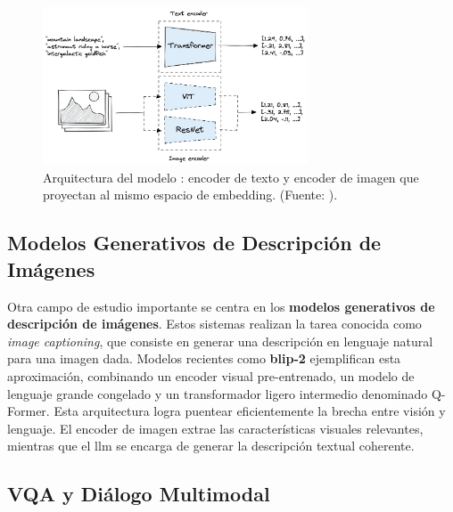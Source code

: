 \begin{figure}[h]
  \centering
  \includegraphics[width=0.7\textwidth]{archivos/clip_architecture.png}
  \caption[Arquitectura de CLIP]{Arquitectura del modelo : encoder de texto y encoder de imagen que proyectan al mismo espacio de embedding. (Fuente: \citep{noauthor_multi-modal_nodate}).}
  \label{fig:clip_architecture}
\end{figure}

\subsection{Modelos Generativos de Descripción de Imágenes}

Otra campo de estudio importante se centra en los \textbf{modelos generativos de descripción de imágenes}. Estos sistemas realizan la tarea conocida como \emph{image captioning}, que consiste en generar una descripción en lenguaje natural para una imagen dada. Modelos recientes como \textbf{\gls{blip}-2} ejemplifican esta aproximación, combinando un encoder visual pre-entrenado, un modelo de lenguaje grande congelado y un transformador ligero intermedio denominado Q-Former. Esta arquitectura logra puentear eficientemente la brecha entre visión y lenguaje. El encoder de imagen extrae las características visuales relevantes, mientras que el \gls{llm} se encarga de generar la descripción textual coherente.

\subsection{VQA y Diálogo Multimodal}

